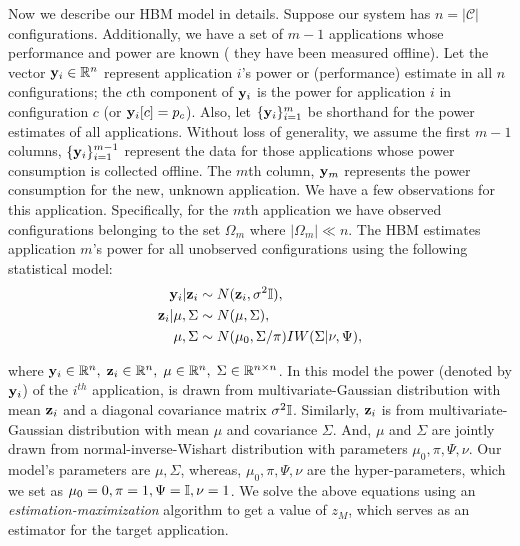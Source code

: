 Now we describe our HBM model in details. Suppose our system has $n = |\mathcal{C}|$ configurations.    Additionally, we have a set of $m-1$
applications whose performance and power are known (\ie{} they have
been measured offline). Let the vector $\mathbf{y}_i \in \mathbb{R}^{n}$ represent
application $i$'s power or (performance) estimate in all $n$
configurations; \ie{} the $c$th component of $\mathbf{y}_i$ is the power for
application $i$ in configuration $c$ (or $\mathbf{y}_i[c] = p_c$).  Also, let
$\{\mathbf{y}_i\}_{i =1}^m$ be shorthand for the power estimates of all
applications.  Without loss of generality, we assume the first $m-1$
columns, \ie{} $\{\mathbf{y}_i\}_{i =1}^{m-1}$ represent the data for those
applications whose power consumption is collected offline.  The $m$th
column, $\mathbf{y}_m$ represents the power consumption for the new, unknown
application.  We have a few observations for this application.
Specifically, for the $m$th application we have observed
configurations belonging to the set $\Omega_m$ where $|\Omega_m| \ll
n$.  The HBM estimates application $m$'s power for all unobserved
configurations using the following statistical model:
\begin{equation}
\begin{aligned}
\mathbf{y}_i \vert \mathbf{z}_i  &\sim N( \mathbf{z}_i, \sigma^2 \mathbb{I}),\\
\mathbf{z}_i \vert \mu,\Sigma &\sim N(\mu, \Sigma),\\
\mu, \Sigma &\sim N(\mu_0,\Sigma / \pi)IW(\Sigma | \nu, \Psi),
\end{aligned}
\label{eq:HBN}
\end{equation}

where $\mathbf{y}_i \in \mathbb{R}^n, \; \mathbf{z}_i \in \mathbb{R}^n, \; \mu \in \mathbb{R}^{n}, \; \Sigma
\in \mathbb{R}^{n\times n}$. In this model the power (denoted by $\mathbf{y}_i$) of
the $i^{th}$ application, is drawn from multivariate-Gaussian
distribution with mean $\mathbf{z}_i$ and a diagonal covariance matrix
$\sigma^2\mathbb{I}$.  Similarly, $\mathbf{z}_i$ is from multi\-variate-Gaussian
distribution with mean $\mu$ and covariance $\Sigma$. And, $\mu$ and
$\Sigma$ are jointly drawn from normal-inverse-Wishart distribution
with parameters $\mu_0, \pi,\Psi, \nu$.  Our model's parameters are
$\mu,\Sigma$, whereas, $\mu_0, \pi,\Psi, \nu$ are the
hyper-para\-meters, which we set as $\mu_0 = 0, \pi = 1,\Psi = \mathbb{I}, \nu =
1$.  We solve the above equations using an
\emph{estimation-maximization} algorithm to get a value of $z_M$,
which serves as an estimator for the target application.




